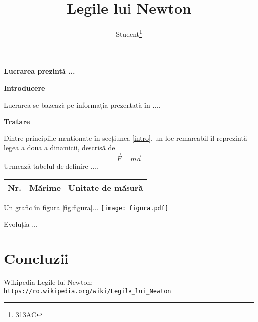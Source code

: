 \documentclass{slides}
\title{Legile lui Newton}
\author{Student\footnote{313AC}}
\date{}
\begin{document}
\maketitle
\textbf{Lucrarea prezintă ...}
%
\begin{center}
\textbf{Introducere}
\end{center}
Lucrarea se bazează pe informația prezentată în \cite{wiki}....
\begin{center}
\textbf{Tratare}
\end{center}
Dintre principiile mentionate în secțiunea \ref{intro}, un loc remarcabil îl reprezintă legea a doua a dinamicii, descrisă de
\begin{equation}
\vec{F}=m\vec{a}
\end{equation}
Urmează tabelul de definire ....
\centering
\begin{tabular}{lll}
\hline
Nr.&Mărime&Unitate de măsură\\\hline
\end{tabular}
Un grafic în figura \ref{fig:figura}...
\centering
\texttt{[image: figura.pdf]}
\caption{Evoluția ...}\label{fig:figura}
\section{Concluzii}
\begin{thebibliography}{a}
 Wikipedia-Legile lui Newton: \verb+https://ro.wikipedia.org/wiki/Legile_lui_Newton+
\end{thebibliography}
\end{document}
